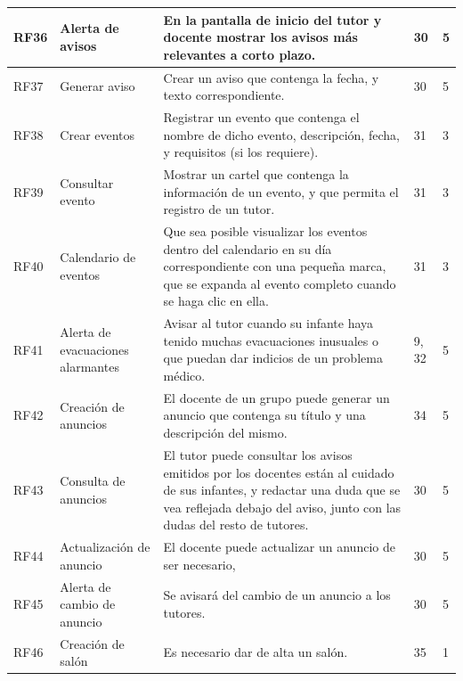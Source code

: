 \documentclass{article}
\begin{document}
\begin{longtable}{|p{1.0cm}|p{3.0cm}|p{5.0cm}|p{1.2cm}|p{0.75cm}|}
	RF36 &
	Alerta de avisos &
	En la pantalla de inicio del tutor y docente mostrar los avisos más relevantes a corto plazo. &
	30 & 
	 5
	\\ \hline

	RF37 &
	Generar aviso &
	Crear un aviso que contenga la fecha, y texto correspondiente. &
	30 & 
	 5
	\\ \hline

	RF38 &
	Crear eventos &
	Registrar un evento que contenga el nombre de dicho evento, descripción, fecha, y requisitos (si los requiere). &
	31 & 
	 3
	\\ \hline

	RF39 &
	Consultar evento &
	Mostrar un cartel que contenga la información de un evento, y que permita el registro de un tutor. &
	31 & 
	 3
	\\ \hline

	RF40 &
	Calendario de eventos &
	Que sea posible visualizar los eventos dentro del calendario en su día correspondiente con una pequeña marca, que se expanda al evento completo cuando se haga clic en ella. &
	31 & 
	 3
	\\ \hline
	
	RF41 &
	Alerta de evacuaciones alarmantes &
	Avisar al tutor cuando su infante haya tenido muchas evacuaciones inusuales o que puedan dar indicios de un problema médico. &
	9, 32 & 
	 5
	\\ \hline

	RF42 &
	Creación de anuncios &
	El docente de un grupo puede generar un anuncio que contenga su título y una descripción del mismo. &
	34 & 
	 5
	\\ \hline

	RF43 &
	Consulta de anuncios &
	El tutor puede consultar los avisos emitidos por los docentes están al cuidado de sus infantes, y redactar una duda que se vea reflejada debajo del aviso, junto con las dudas del resto de tutores.  &
	30 & 
	 5
	\\ \hline

	RF44 &
	Actualización de anuncio &
	El docente puede actualizar un anuncio de ser necesario, &
	30 & 
	 5
	\\ \hline

	RF45 &
	Alerta de cambio de anuncio &
	Se avisará del cambio de un anuncio a los tutores. &
	30 & 
	 5
	\\ \hline

	RF46 &
	Creación de salón &
	Es necesario dar de alta un salón. &
	35 & 
	 1
	\\ \hline


\end{longtable}
\end{document}
